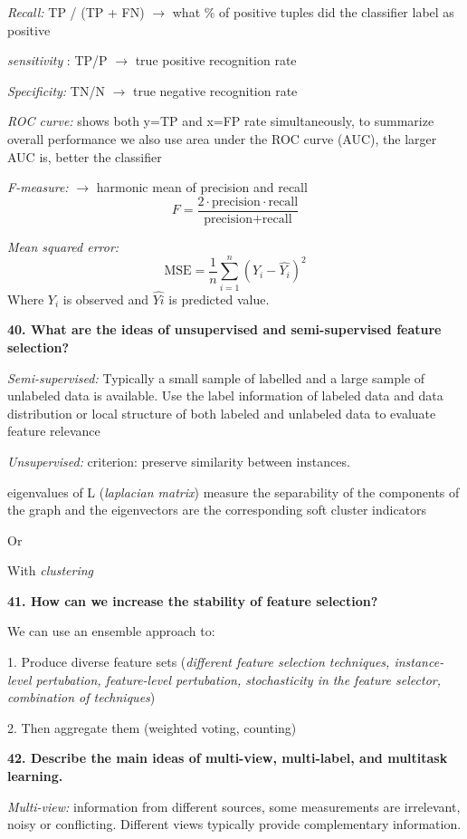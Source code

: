 \textit{Recall:} TP / (TP + FN) $\rightarrow$ what \% of positive
tuples did the classifier label as positive

\textit{sensitivity} : TP/P $\rightarrow$ true positive recognition
rate

\textit{Specificity:} TN/N $\rightarrow$ true negative recognition
rate

\textit{ROC curve:} shows both y=TP and x=FP rate simultaneously, to
summarize overall performance we also use area under the ROC curve
(AUC), the larger AUC is, better the classifier

\textit{F-measure:} $\rightarrow$ harmonic mean of precision and
recall
\[ F = \frac{2 \cdot \text{precision} \cdot \text{recall} }{\text{precision} + \text{recall}} \]

\textit{Mean squared error:}
\[ \text{MSE} = \frac{1}{n} \sum_{i=1}^n (Y_i - \hat{Y_i})^2\]
Where $Y_i$ is observed and $\hat{Yi}$ is predicted value.


\textbf{40. What are the ideas of unsupervised and semi-supervised
feature selection?}

\textit{Semi-supervised:} Typically a small sample of labelled and a
large sample of unlabeled data is available. Use the label information
of labeled data and data distribution or local structure of both labeled
and unlabeled data to evaluate feature relevance

\textit{Unsupervised:} criterion: preserve similarity between
instances.

eigenvalues of L (\textit{laplacian matrix}) measure the separability of
the components of the graph and the eigenvectors are the corresponding
soft cluster indicators

Or

With \textit{clustering}

\textbf{41. How can we increase the stability of feature selection?}

We can use an ensemble approach to:

1. Produce diverse feature sets (\textit{different feature selection techniques, 
instance-level pertubation, feature-level pertubation, stochasticity 
in the feature selector, combination of techniques})

2. Then aggregate them (weighted voting, counting)

\textbf{42. Describe the main ideas of multi-view, multi-label, and
multitask learning.}

\textit{Multi-view:} information from different sources, some
measurements are irrelevant, noisy or conflicting. Different views
typically provide complementary information.

